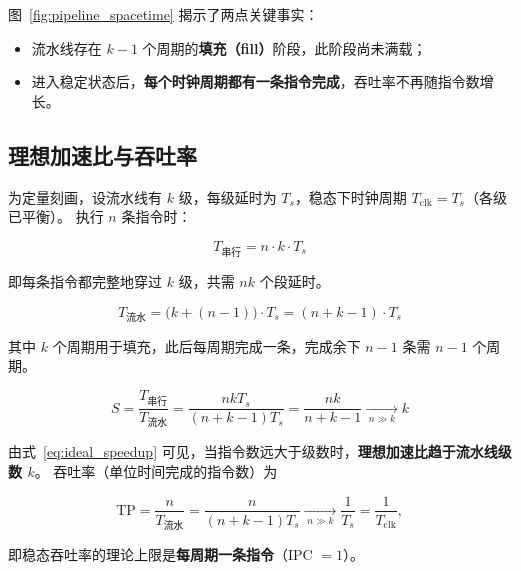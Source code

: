 图~\ref{fig:pipeline_spacetime} 揭示了两点关键事实：
\begin{itemize}
    \item 流水线存在 $k-1$ 个周期的\textbf{填充（fill）}阶段，此阶段尚未满载；
    \item 进入稳定状态后，\textbf{每个时钟周期都有一条指令完成}，吞吐率不再随指令数增长。
\end{itemize}

\subsection{理想加速比与吞吐率}

为定量刻画，设流水线有 $k$ 级，每级延时为 $T_s$，稳态下时钟周期 $T_{\text{clk}} = T_s$（各级已平衡）。
执行 $n$ 条指令时：

\begin{equation}
T_{\text{串行}} = n \cdot k \cdot T_s
\end{equation}

即每条指令都完整地穿过 $k$ 级，共需 $n k$ 个段延时。

\begin{equation}
T_{\text{流水}} = \bigl(k + (n-1)\bigr) \cdot T_s = (n + k - 1) \cdot T_s
\end{equation}

其中 $k$ 个周期用于填充，此后每周期完成一条，完成余下 $n-1$ 条需 $n-1$ 个周期。

\begin{equation}
S = \frac{T_{\text{串行}}}{T_{\text{流水}}}
  = \frac{n k T_s}{(n+k-1) T_s}
  = \frac{n k}{n+k-1}
  \xrightarrow[\;n \gg k\;]{} k
\label{eq:ideal_speedup}
\end{equation}

由式~\eqref{eq:ideal_speedup} 可见，当指令数远大于级数时，\textbf{理想加速比趋于流水线级数 $k$}。
吞吐率（单位时间完成的指令数）为

\begin{equation}
\text{TP} = \frac{n}{T_{\text{流水}}} = \frac{n}{(n+k-1) T_s}
  \xrightarrow[\;n \gg k\;]{} \frac{1}{T_s} = \frac{1}{T_{\text{clk}}},
\label{eq:throughput}
\end{equation}

即稳态吞吐率的理论上限是\textbf{每周期一条指令}（IPC $= 1$）。

